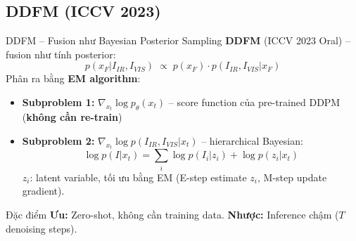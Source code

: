 \documentclass{beamer}
\begin{document}
\subsection{DDFM (ICCV 2023)}

\begin{frame}{DDFM -- Fusion như Bayesian Posterior Sampling}
    \small
    \textbf{DDFM} (ICCV 2023 Oral) -- fusion như tính posterior:
    \vspace{-0.15cm}
    \begin{equation}
        p(x_F | I_{IR}, I_{VIS}) \;\propto\; p(x_F) \cdot p(I_{IR}, I_{VIS} | x_F)
    \end{equation}
    \vspace{-0.2cm}
    Phân ra bằng \textbf{EM algorithm}:
    \begin{itemize}\setlength{\itemsep}{2pt}
        \item \textbf{Subproblem 1:} $\nabla_{x_t} \log p_\theta(x_t)$ -- score function của pre-trained DDPM (\textbf{không cần re-train})
        \item \textbf{Subproblem 2:} $\nabla_{x_t} \log p(I_{IR}, I_{VIS} | x_t)$ -- hierarchical Bayesian:
        \vspace{-0.1cm}
        \begin{equation}
            \log p(I | x_t) = \sum_i \log p(I_i | z_i) + \log p(z_i | x_t)
        \end{equation}
        \vspace{-0.3cm}
        \footnotesize $z_i$: latent variable, tối ưu bằng EM (E-step estimate $z_i$, M-step update gradient).
    \end{itemize}

    \vspace{0.1cm}
    \begin{block}{\footnotesize Đặc điểm}
        \footnotesize \textbf{Ưu:} Zero-shot, không cần training data. \textbf{Nhược:} Inference chậm ($T$ denoising steps).
    \end{block}
\end{frame}
\end{document}
